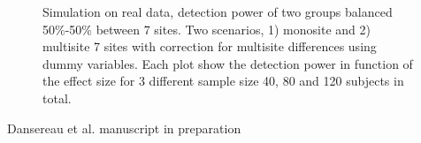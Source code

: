 \documentclass[authoryear]{elsarticle}
\begin{document}
\begin{figure}[H!]
\centering
\captionsetup[subfloat]{labelformat=empty}
\hspace{1mm}
\hspace{1mm}
\hspace{1mm}
\tiny Simulation on real data, detection power of two groups balanced 50\%-50\% between 7 sites. Two scenarios, 1) monosite and 2) multisite 7 sites with correction for multisite differences using dummy variables. Each plot show the detection power in function of the effect size for 3 different sample size 40, 80 and 120 subjects in total.
\end{figure}
\tiny Dansereau et al. manuscript in preparation
\end{document}
